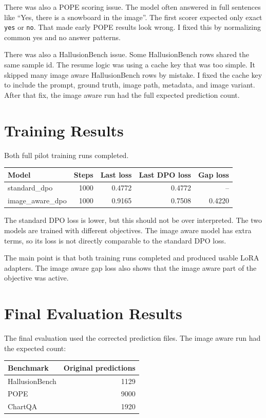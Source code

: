 \documentclass{article}
\begin{document}
There was also a POPE scoring issue.
The model often answered in full sentences like ``Yes, there is a snowboard in the image''.
The first scorer expected only exact \texttt{yes} or \texttt{no}.
That made early POPE results look wrong.
I fixed this by normalizing common yes and no answer patterns.

There was also a HallusionBench issue.
Some HallusionBench rows shared the same sample id.
The resume logic was using a cache key that was too simple.
It skipped many image aware HallusionBench rows by mistake.
I fixed the cache key to include the prompt, ground truth, image path, metadata, and image variant.
After that fix, the image aware run had the full expected prediction count.

\section{Training Results}
Both full pilot training runs completed.

\begin{center}
\begin{tabular}{lrrrr}
\toprule
Model & Steps & Last loss & Last DPO loss & Gap loss \\
\midrule
standard\_dpo & 1000 & 0.4772 & 0.4772 & -- \\
image\_aware\_dpo & 1000 & 0.9165 & 0.7508 & 0.4220 \\
\bottomrule
\end{tabular}
\end{center}

The standard DPO loss is lower, but this should not be over interpreted.
The two models are trained with different objectives.
The image aware model has extra terms, so its loss is not directly comparable to the standard DPO loss.

The main point is that both training runs completed and produced usable LoRA adapters.
The image aware gap loss also shows that the image aware part of the objective was active.

\section{Final Evaluation Results}
The final evaluation used the corrected prediction files.
The image aware run had the expected count:

\begin{center}
\begin{tabular}{lr}
\toprule
Benchmark & Original predictions \\
\midrule
HallusionBench & 1129 \\
POPE & 9000 \\
ChartQA & 1920 \\
\bottomrule
\end{tabular}
\end{center}
\end{document}
